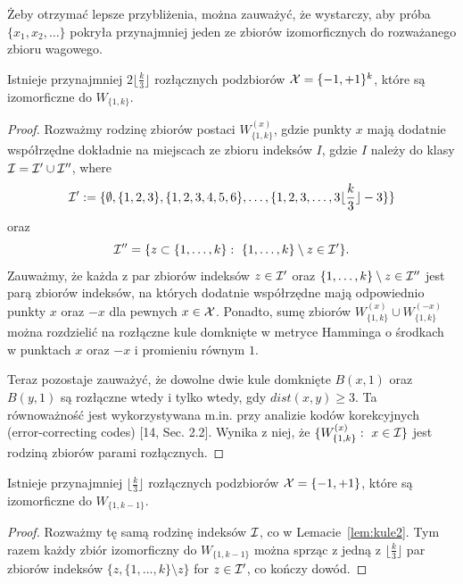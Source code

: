 \noindent
Żeby otrzymać lepsze przybliżenia, można zauważyć, że wystarczy, aby próba $\{x_1,x_2,\ldots\}$ pokryła przynajmniej jeden ze zbiorów izomorficznych do rozważanego zbioru wagowego.
\begin{lemma}
Istnieje przynajmniej $2\lfloor\frac{k}{3}\rfloor$ rozłącznych podzbiorów $\mathcal{X}=\{-1,+1\}^k$, które są izomorficzne do $W_{\{1,k\}}$.
\end{lemma}\label{lem:kule2}
\begin{proof}
Rozważmy rodzinę zbiorów postaci $W^{(x)}_{\{1,k\}}$, gdzie punkty $x$ mają dodatnie współrzędne dokładnie na miejscach ze zbioru indeksów $I$, gdzie $I$ należy do klasy $\mathcal{I} = \mathcal{I}' \cup \mathcal{I}''$, where
$$
\mathcal{I}' := \{\emptyset, \{1,2,3\}, \{1,2,3,4,5,6\}, \ldots, \{1,2,3,\ldots,3\lfloor\frac{k}{3}\rfloor-3\}\}
$$
oraz 
$$
\set{I}'' = \{z\subset\{1,\ldots,k\}:\ \{1,\ldots,k\}\setminus z \in \set{I}' \}.
$$
Zauważmy, że każda z par zbiorów indeksów $z\in\mathcal{I}'$ oraz $\{1,\ldots,k\}\setminus z\in\mathcal{I}''$ jest parą zbiorów indeksów, na których dodatnie współrzędne mają odpowiednio punkty $x$ oraz $-x$ dla pewnych $x\in\mathcal{X}$. Ponadto, sumę zbiorów $W^{(x)}_{\{1,k\}} \cup W^{(-x)}_{\{1,k\}}$ można rozdzielić na rozłączne kule domknięte w metryce Hamminga o środkach w punktach $x$ oraz $-x$ i promieniu równym $1$.

\noindent
Teraz pozostaje zauważyć, że dowolne dwie kule domknięte $B(x,1)$ oraz $B(y,1)$ są rozłączne wtedy i tylko wtedy, gdy $dist(x,y)\geq 3$. Ta równoważność jest wykorzystywana m.in. przy analizie kodów korekcyjnych (error-correcting codes) [14, Sec. 2.2]. Wynika z niej, że $\{W^{(x)}_{\{1,k\}}:\ x\in\mathcal{I}\}$ jest rodziną zbiorów parami rozłącznych.
\end{proof}
\begin{remark}\label{rem:kule3}
Istnieje przynajmniej $\lfloor\frac{k}{3}\rfloor$ rozłącznych podzbiorów $\mathcal{X}=\{-1,+1\}$, które są izomorficzne do $W_{\{1,k-1\}}$.
\end{remark}
\begin{proof}
Rozważmy tę samą rodzinę indeksów $\mathcal{I}$, co w Lemacie~\ref{lem:kule2}. Tym razem każdy zbiór izomorficzny do $W_{\{1,k-1\}}$ można sprząc z jedną z $\lfloor\frac{k}{3}\rfloor$ par zbiorów indeksów $\{z, \{1,\ldots,k\}\setminus z\}$ for $z\in\mathcal{I}'$, co kończy dowód.
\end{proof}

